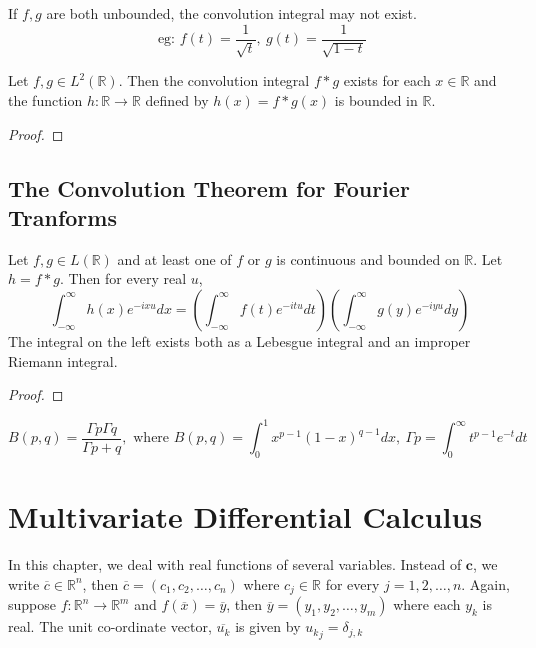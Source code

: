 \begin{remark}
	If $f,g$ are both unbounded, the convolution integral may not exist.
	\[ \text{ eg: } f(t) = \frac{1}{\sqrt{t}},\ g(t) = \frac{1}{\sqrt{1-t}} \]
\end{remark}

\begin{theorem}
	Let \( f,g \in L^2(\mathbb{R}) \).
	Then the convolution integral $f \ast g$ exists for each \( x \in \mathbb{R} \) and the function \( h : \mathbb{R} \to \mathbb{R} \) defined by \( h(x) = f \ast g (x) \) is bounded in $\mathbb{R}$.
\end{theorem}
\begin{synopsis}
\end{synopsis}
\begin{proof}
\end{proof}

\subsection{The Convolution Theorem for Fourier Tranforms}
\begin{theorem}
	Let \( f,g \in L(\mathbb{R}) \) and at least one of $f$ or $g$ is continuous and bounded on $\mathbb{R}$.
	Let \( h = f \ast g \).
	Then for every real $u$,
	\[ \int_{-\infty}^\infty h(x) e^{-ixu} dx = \left( \int_{-\infty}^\infty f(t) e^{-itu} dt \right) \left( \int_{-\infty}^\infty g(y) e^{-iyu} dy \right) \]
	The integral on the left exists both as a Lebesgue integral and an improper Riemann integral.
\end{theorem}
\begin{synopsis}
\end{synopsis}
\begin{proof}
\end{proof}

\begin{remark}
	\[ B(p,q) = \frac{\Gamma{p} \Gamma{q}}{\Gamma{p+q}},\text{ where } B(p,q) = \int_0^1 x^{p-1} (1-x)^{q-1} dx,\ \Gamma{p} = \int_0^\infty t^{p-1} e^{-t} dt \]
\end{remark}

\section{Multivariate Differential Calculus}
	In this chapter, we deal with real functions of several variables.
	Instead of $\mathbf{c}$, we write \( \overline{c} \in \mathbb{R}^n \), then \( \overline{c} = (c_1, c_2, \dotsc, c_n) \) where \( c_j \in \mathbb{R} \) for every \(j = 1,2, \dotsc, n\).
	Again, suppose \(f : \mathbb{R}^n \to \mathbb{R}^m\) and \(f(\overline{x}) = \overline{y}\), then \(\overline{y} = (y_1, y_2, \dotsc, y_m)\) where each $y_k$ is real.
	The unit co-ordinate vector, $\overline{u_k}$ is given by \( {u_k}_j = \delta_{j,k} \)

